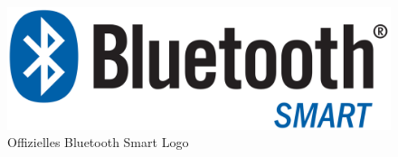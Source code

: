 \begin{figure}[H]
\centering
\includegraphics[scale=0.07]{Bilder/BLE.png} 
\caption{Offizielles Bluetooth Smart Logo \cite{BLElogo}}
\label{BLElogo}
\end{figure}
%
